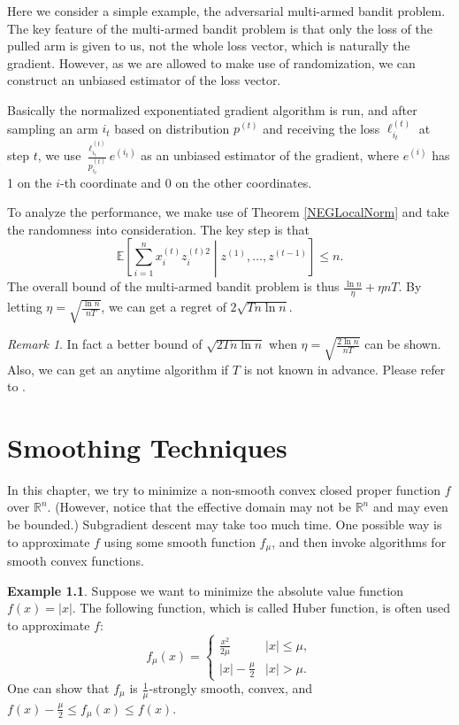 \documentclass[openany]{book}
\theoremstyle{definition}
\newtheorem{example}{Example}[chapter]
\theoremstyle{remark}
\newtheorem*{remark}{Remark}
\begin{document}
Here we consider a simple example, the adversarial multi-armed bandit problem. The key feature of the multi-armed bandit problem is that only the loss of the pulled arm is given to us, not the whole loss vector, which is naturally the gradient. However, as we are allowed to make use of randomization, we can construct an unbiased estimator of the loss vector.

Basically the normalized exponentiated gradient algorithm is run, and after sampling an arm $i_t$ based on distribution $p^{(t)}$ and receiving the loss $\ell_{i_t}^{(t)}$ at step $t$, we use $\frac{\ell_{i_t}^{(t)}}{p_{i_t}^{(t)}}e^{(i_t)}$ as an unbiased estimator of the gradient, where $e^{(i)}$ has 1 on the $i$-th coordinate and $0$ on the other coordinates.

To analyze the performance, we make use of Theorem \ref{NEGLocalNorm} and take the randomness into consideration. The key step is that
\begin{equation}
    \mathbb{E}\left[\sum_{i=1}^{n}x_i^{(t)}z_i^{(t)2}\middle|z^{(1)},\ldots,z^{(t-1)}\right]\le n.
\end{equation}
The overall bound of the multi-armed bandit problem is thus $\frac{\ln n}{\eta}+\eta nT$. By letting $\eta=\sqrt{\frac{\ln n}{nT}}$, we can get a regret of $2\sqrt{Tn\ln n}$.
\begin{remark}
    In fact a better bound of $\sqrt{2Tn\ln n}$ when $\eta=\sqrt{\frac{2\ln n}{nT}}$ can be shown. Also, we can get an anytime algorithm if $T$ is not known in advance. Please refer to \cite{BC12}.
\end{remark}

\chapter{Smoothing Techniques}
In this chapter, we try to minimize a non-smooth convex closed proper function $f$ over $\mathbb{R}^n$. (However, notice that the effective domain may not be $\mathbb{R}^n$ and may even be bounded.) Subgradient descent may take too much time. One possible way is to approximate $f$ using some smooth function $f_{\mu}$, and then invoke algorithms for smooth convex functions.

\begin{example}
    Suppose we want to minimize the absolute value function $f(x)=|x|$. The following function, which is called Huber function, is often used to approximate $f$:
    \begin{equation}
        f_{\mu}(x)=\left\{
        \begin{array}{ll}
            \frac{x^2}{2\mu} & |x|\le\mu, \\
            |x|-\frac{\mu}{2} & |x|>\mu.
        \end{array}
        \right.
    \end{equation}
    One can show that $f_{\mu}$ is $\frac{1}{\mu}$-strongly smooth, convex, and $f(x)-\frac{\mu}{2}\le f_{\mu}(x)\le f(x)$.
\end{example}
\end{document}

